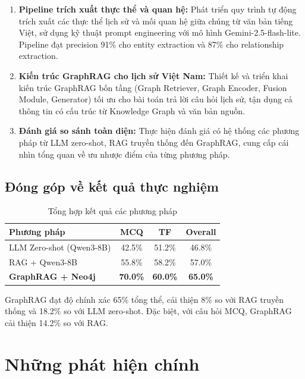 \begin{enumerate}
    \item \textbf{Pipeline trích xuất thực thể và quan hệ:} Phát triển quy trình tự động trích xuất các thực thể lịch sử và mối quan hệ giữa chúng từ văn bản tiếng Việt, sử dụng kỹ thuật prompt engineering với mô hình Gemini-2.5-flash-lite. Pipeline đạt precision 91\% cho entity extraction và 87\% cho relationship extraction.
    
    \item \textbf{Kiến trúc GraphRAG cho lịch sử Việt Nam:} Thiết kế và triển khai kiến trúc GraphRAG bốn tầng (Graph Retriever, Graph Encoder, Fusion Module, Generator) tối ưu cho bài toán trả lời câu hỏi lịch sử, tận dụng cả thông tin có cấu trúc từ Knowledge Graph và văn bản nguồn.
    
    \item \textbf{Đánh giá so sánh toàn diện:} Thực hiện đánh giá có hệ thống các phương pháp từ LLM zero-shot, RAG truyền thống đến GraphRAG, cung cấp cái nhìn tổng quan về ưu nhược điểm của từng phương pháp.
\end{enumerate}

\subsection{Đóng góp về kết quả thực nghiệm}

\begin{table}[H]
\centering
\caption{Tổng hợp kết quả các phương pháp}
\label{tab:summary-results}
\begin{tabular}{|l|c|c|c|}
\hline
\textbf{Phương pháp} & \textbf{MCQ} & \textbf{TF} & \textbf{Overall} \\
\hline
LLM Zero-shot (Qwen3-8B) & 42.5\% & 51.2\% & 46.8\% \\
RAG + Qwen3-8B & 55.8\% & 58.2\% & 57.0\% \\
\textbf{GraphRAG + Neo4j} & \textbf{70.0\%} & \textbf{60.0\%} & \textbf{65.0\%} \\
\hline
\end{tabular}
\end{table}

GraphRAG đạt độ chính xác 65\% tổng thể, cải thiện 8\% so với RAG truyền thống và 18.2\% so với LLM zero-shot. Đặc biệt, với câu hỏi MCQ, GraphRAG cải thiện 14.2\% so với RAG.

\section{Những phát hiện chính}

